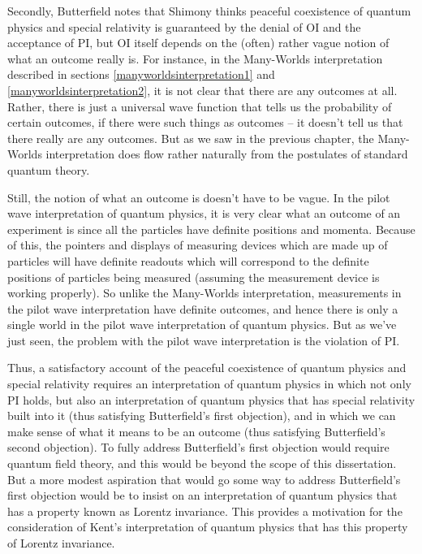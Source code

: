 Secondly,  Butterfield notes that Shimony thinks peaceful coexistence of quantum physics and special relativity is guaranteed by the denial of OI and the acceptance of PI, but OI itself depends on the (often) rather vague notion of what an outcome really is. For instance, in the Many-Worlds interpretation described in sections \ref{manyworldsinterpretation1} and \ref{manyworldsinterpretation2}, it is not clear that there are any outcomes at all. Rather, there is just a universal wave function that tells us the probability of certain outcomes, if there were such things as outcomes -- it doesn't tell us that there really are any outcomes. But as we saw in the previous chapter, the Many-Worlds interpretation does flow rather naturally from the postulates of standard quantum theory. 

Still, the notion of what an outcome is doesn't have to be vague. In the pilot wave interpretation of quantum physics, it is very clear what an outcome of an experiment is since all the particles have definite positions and momenta. Because of this, the pointers and displays of measuring devices which are made up of particles will have definite readouts which will correspond to the definite positions of particles being measured (assuming the measurement device is working properly). So unlike the Many-Worlds interpretation, measurements in the pilot wave interpretation have definite outcomes, and hence there is only a single world in the pilot wave interpretation of quantum physics. But as we've just seen, the problem with the pilot wave interpretation is the violation of PI.  

Thus, a satisfactory account of the peaceful coexistence of quantum physics and special relativity requires an interpretation of quantum physics in which not only PI holds, but also an interpretation of quantum physics that has special relativity built into it (thus satisfying Butterfield's first objection), and in which we can make sense of what it means to be an outcome (thus satisfying Butterfield's second objection). To fully address Butterfield's first objection would require quantum field theory, and this would be beyond the scope of this dissertation. But a more modest aspiration that would go some way to address Butterfield's first objection would be to insist on an interpretation of quantum physics that has a property known as Lorentz invariance. This provides a motivation for the consideration of Kent's interpretation of quantum physics that has this property of Lorentz invariance.
